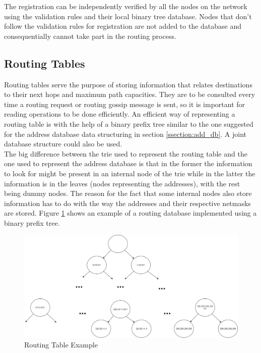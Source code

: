 The registration can be independently verified by all the nodes on the network using the validation rules and their local binary tree database. Nodes that don't follow the validation rules for registration are not added to the database and consequentially cannot take part in the routing process. \\

\subsection{Routing Tables}

Routing tables serve the purpose of storing information that relates destinations to their next hops and maximum path capacities. They are to be consulted every time a routing request or routing gossip message is sent, so it is important for reading operations to be done efficiently. An efficient way of representing a routing table is with the help of a binary prefix tree similar to the one suggested for the address database data structuring in section \ref{ssection:add_db}. A joint database structure could also be used. \\
The big difference between the trie used to represent the routing table and the one used to represent the address database is that in the former the information to look for might be present in an internal node of the trie while in the latter the information is in the leaves (nodes representing the addresses), with the rest being dummy nodes. The reason for the fact that some internal nodes also store information has to do with the way the addresses and their respective netmasks are stored. Figure \ref{fig:reg_addr_db_example} shows an example of a routing database implemented using a binary prefix tree.

\begin{figure}[H]
\begin{center}
  \includegraphics[width=0.8\linewidth]{images/routing_db_example.png}
  \caption{Routing Table Example}
  \label{fig:reg_addr_db_example}
  \end{center}
\end{figure}

